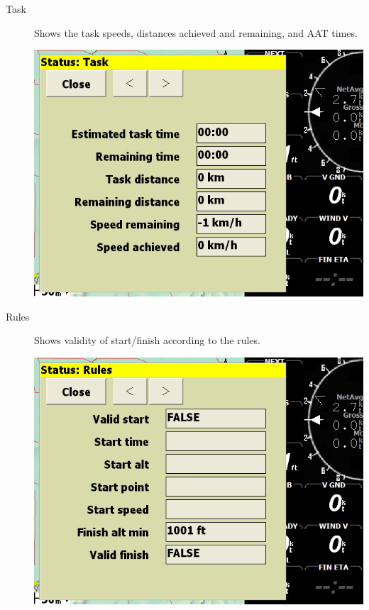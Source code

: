 \documentclass[a4paper,12pt]{refrep}
\begin{document}
\begin{description}
\item[Task]  Shows the task speeds, distances achieved and remaining, and AAT
  times.

\begin{center}
\includegraphics[angle=0,width=\linewidth,keepaspectratio='true']{figures/status-task.png}
\end{center}


\item[Rules]  Shows validity of start/finish according to the rules.

\begin{center}
\includegraphics[angle=0,width=\linewidth,keepaspectratio='true']{figures/status-rules.png}
\end{center}


\end{description}
\end{document}
